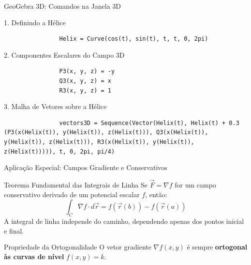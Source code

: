 \documentclass[aspectratio=169, 13pt]{beamer}
\begin{document}
	\begin{frame}[fragile]{GeoGebra 3D: Comandos na Janela 3D}
		\begin{block}{1. Definindo a Hélice}
			\begin{lstlisting}
				Helix = Curve(cos(t), sin(t), t, t, 0, 2pi)
			\end{lstlisting}
		\end{block}
		
		\begin{block}{2. Componentes Escalares do Campo 3D}
			\begin{lstlisting}
				P3(x, y, z) = -y
				Q3(x, y, z) = x
				R3(x, y, z) = 1
			\end{lstlisting}
		\end{block}
		
		\begin{block}{3. Malha de Vetores sobre a Hélice}
			\begin{lstlisting}
				vectors3D = Sequence(Vector(Helix(t), Helix(t) + 0.3 (P3(x(Helix(t)), y(Helix(t)), z(Helix(t))), Q3(x(Helix(t)), y(Helix(t)), z(Helix(t))), R3(x(Helix(t)), y(Helix(t)), z(Helix(t))))), t, 0, 2pi, pi/4)
			\end{lstlisting}
		\end{block}
	\end{frame}
	
	\begin{frame}{Aplicação Especial: Campos Gradiente e Conservativos}
		\begin{block}{Teorema Fundamental das Integrais de Linha}
			Se $\vec{F} = \nabla f$ for um campo conservativo derivado de um potencial escalar $f$, então:
			$$\int_C \nabla f \cdot d\vec{r} = f(\vec{r}(b)) - f(\vec{r}(a))$$
			A integral de linha independe do caminho, dependendo apenas dos pontos inicial e final.
		\end{block}
		
		\vspace{0.2cm}
		\begin{exampleblock}{Propriedade da Ortogonalidade}
			O vetor gradiente $\nabla f(x,y)$ é sempre \textbf{ortogonal às curvas de nível} $f(x,y) = k$.
		\end{exampleblock}
	\end{frame}
	
\end{document}
